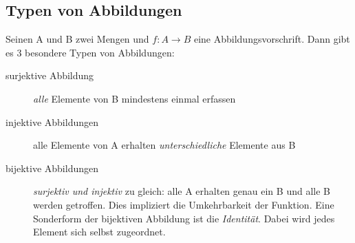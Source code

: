 \subsection{Typen von Abbildungen}
Seinen A und B zwei Mengen und $f:{A}\longrightarrow{B}$ eine Abbildungsvorschrift.
Dann gibt es 3 besondere Typen von Abbildungen:

\begin{description}
\item[surjektive Abbildung] \emph{alle} Elemente von B mindestens einmal erfassen
\item[injektive Abbildungen] alle Elemente von A erhalten \emph{unterschiedliche} Elemente aus B
\item[bijektive Abbildungen] \emph{surjektiv und injektiv} zu gleich: alle A erhalten genau ein B und alle B werden getroffen.
Dies impliziert die Umkehrbarkeit der Funktion. Eine Sonderform der bijektiven
Abbildung ist die \emph{Identität}. Dabei wird jedes Element sich selbst zugeordnet.
\end{description}

\begin{figure}
\hfill
{}\hfill
{}\hfill
{}
\end{figure}